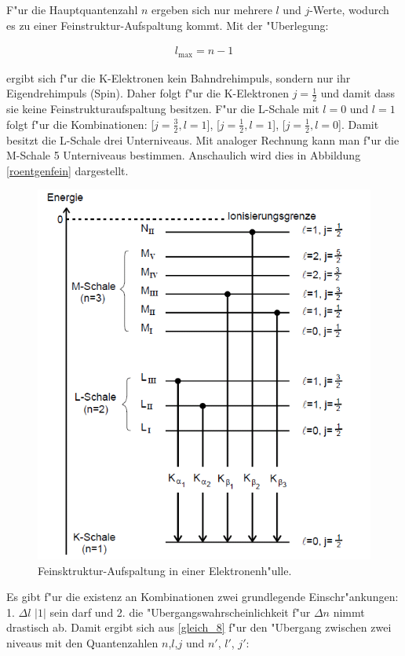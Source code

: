 		F"ur die Hauptquantenzahl $n$ ergeben sich nur mehrere $l$ und $j$-Werte, wodurch es zu einer Feinstruktur-Aufspaltung kommt.
		Mit der "Uberlegung:

		\begin{eqnarray*}
			l_\mathrm{max} = n - 1
		\end{eqnarray*}

		ergibt sich f"ur die K-Elektronen kein Bahndrehimpuls, sondern nur ihr Eigendrehimpuls (Spin). 
		Daher folgt f"ur die K-Elektronen $j = \frac{1}{2}$ und damit dass sie keine Fein\-struk\-tur\-auf\-spal\-tung besitzen.
		F"ur die L-Schale mit $l = 0$ und $l = 1$ folgt f"ur die Kombinationen: [$j = \frac{3}{2}, l = 1$], [$j = \frac{1}{2}, l = 1$], [$j = \frac{1}{2}, l = 0$].
		Damit besitzt die L-Schale drei Unterniveaus.
		Mit analoger Rechnung kann man f"ur die M-Schale 5 Unterniveaus bestimmen.
		Anschaulich wird dies in Abbildung \eqref{roentgenfein} dargestellt.

		\begin{figure}[htbp]
			\centering
			\includegraphics[width = 12cm]{img/Roentgenuebergaengefein.png}
			\caption{Feinsktruktur-Aufspaltung in einer Elektronenh"ulle. \cite{anleitung}}
			\label{roentgenfein}
		\end{figure}	

		Es gibt f"ur die existenz an Kombinationen zwei grundlegende Einschr"ankungen: 
		1. $\Delta l$ \le $|1|$ sein darf und 2. die "Ubergangswahrscheinlichkeit f"ur $\Delta n$  nimmt drastisch ab. 
		Damit ergibt sich aus \eqref{gleich_8} f"ur den "Ubergang zwischen zwei niveaus mit den Quantenzahlen $n$,$l$,$j$ und $n'$, $l'$, $j'$:	

